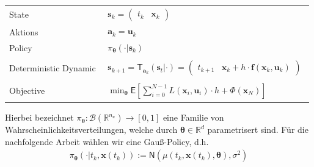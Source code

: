 \documentclass[a4paper, 12pt]{scrartcl}
\begin{document}
\begin{center}
    \begin{tabular}{l |l}
        State
        &
        $\begin{aligned}
            \bm{s}_k
            =
            \begin{pmatrix}
                t_k & \bm{x}_k
            \end{pmatrix}
        \end{aligned}$
        \\
        Aktions 
        & 
        $\begin{aligned}
            \bm{a}_k = \bm{u}_k 
        \end{aligned}$ 
        \\
        Policy 
        &
        $\begin{aligned}
            \pi_{\bm{\theta}}(\cdot | \bm{s}_k) 
        \end{aligned}$ 
        \\
        Deterministic Dynamic
        &
        $\begin{aligned}
            \bm{s}_{k+1} = \mathsf{T}_{\bm{a}_k}( \bm{s}_t | \cdot )
            =
            \begin{pmatrix}
                t_{k+1} & \bm{x}_{k} + h \cdot \bm{f}(\bm{x}_{k},\bm{u}_k)
            \end{pmatrix}
        \end{aligned}$
        \\
        Objective
        & 
        $\begin{aligned}
            \min_{\bm{\theta}}
            \mathsf{E}
            \left[
                \sum_{i=0}^{N-1} 
                L(\bm{x}_i, \bm{u}_i) \cdot h + \Phi(\bm{x}_N)
            \right] 
        \end{aligned}$ 
    \end{tabular}
\end{center}

Hierbei bezeichnet $\pi_{\bm{\theta}}:\mathcal{B}(\mathbb{R}^{n_u}) \to [0,1]$
eine Familie von Wahrscheinlichkeitsverteilungen, welche durch 
$\bm{\theta}\in\mathbb{R}^d$ parametrisert sind. 
Für die nachfolgende Arbeit wählen wir eine Gauß-Policy, d.h.
%
\begin{align}
    \pi_{\bm{\theta}}(\cdot | t_k, \bm{x}(t_k) ) 
    :=  
    \mathsf{N}(\mu(t_k, \bm{x}(t_k), \bm{\theta}), \sigma^2)
    \label{eq:Gauß_Policy}
\end{align}
\end{document}
